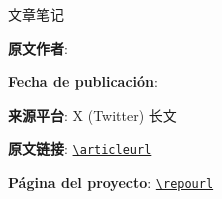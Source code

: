 
\begin{titlepage}
\centering
{\Large 文章笔记\par}
\vspace{1.2cm}
{\huge\bfseries \notetitle\par}
\vspace{0.8cm}
{\large \noteauthors\par}
\vspace{0.3cm}
{\large \notedate\par}
\vfill
\begin{tcolorbox}[width=0.9\textwidth, colback=black!2!white, colframe=black!60, sharp corners]
\textbf{原文作者}: \articleauthor\par
\textbf{Fecha de publicación}: \articlepublishdate\par
\textbf{来源平台}: X (Twitter) 长文\par
\textbf{原文链接}: \href{\articleurl}{\nolinkurl{\articleurl}}\par
\textbf{Página del proyecto}: \href{\repourl}{\nolinkurl{\repourl}}\par
\end{tcolorbox}
\end{titlepage}

\tableofcontents
\newpage


